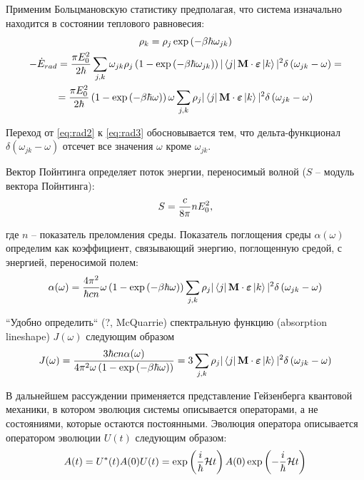 \documentclass[12pt]{article}
\newcommand{\lb}{\left(}
\newcommand{\rb}{\right)}
\newcommand{\mH}{\mathcal{H}}
\newcommand{\mf}{\mathbf}
\newcommand{\vverh}{\vspace*{-0.15cm}}
\begin{document}
Применим Больцмановскую статистику предполагая, что система изначально находится в состоянии теплового равновесия:
\vverh
\begin{gather}
	\rho_k = \rho_j \exp \lb - \beta \hbar \omega_{jk} \rb \notag \\
	- \dot{E}_{rad} = \frac{\pi E_0^2}{2 \hbar} \sum_{j, k} \omega_{jk} \rho_j \lb 1 - \exp \lb - \beta \hbar \omega_{jk} \rb \rb | \bra{j} \mf{M} \cdot \boldsymbol{\varepsilon} \ket{k} |^2 \delta \lb \omega_{jk} - \omega \rb = \label{eq:rad2} \\
	= \frac{\pi E_0^2}{2 \hbar} \lb 1 - \exp \lb - \beta \hbar \omega \rb \rb \omega \sum_{j, k} \rho_j | \bra{j} \mf{M} \cdot \boldsymbol{\varepsilon} \ket{k} |^2 \delta \lb \omega_{jk} - \omega \rb \label{eq:rad3} 
\end{gather}

Переход от \eqref{eq:rad2} к \eqref{eq:rad3} обосновывается тем, что дельта-функционал $\delta \lb \omega_{jk} - \omega \rb$ отсечет все значения $\omega$ кроме $\omega_{jk}$.  

Вектор Пойнтинга определяет поток энергии, переносимый волной ($S$ -- модуль вектора Пойнтинга):
\vverh
\begin{gather}
	S = \frac{c}{8 \pi} n E_0^2, \notag
\end{gather}

где $n$ -- показатель преломления среды. Показатель поглощения среды $\alpha(\omega)$ определим как коэффициент, связывающий энергию, поглощенную средой, с энергией, переносимой полем:
\vverh
\begin{gather}
	\alpha(\omega) = \frac{4 \pi^2}{\hbar c n} \omega \lb 1 - \exp \lb - \beta \hbar \omega \rb \rb \sum_{j, k} \rho_j | \bra{j} \mf{M} \cdot \boldsymbol{\varepsilon} \ket{k} |^2 \delta \lb \omega_{jk} - \omega \rb \notag
\end{gather}

``Удобно определить`` (?, McQuarrie) спектральную функцию (absorption lineshape) $J(\omega)$ следующим образом  
\vverh
\begin{gather}
	J(\omega) = \frac{3 \hbar c n \alpha(\omega)}{4 \pi^2 \omega \lb 1 - \exp \lb - \beta \hbar \omega \rb \rb} = 3 \sum_{j, k} \rho_j | \bra{j} \mf{M} \cdot \boldsymbol{\varepsilon} \ket{k} |^2 \delta \lb \omega_{jk} - \omega \rb \label{eq:specfunc} 
\end{gather}

В дальнейшем рассуждении применяется представление Гейзенберга квантовой механики, в котором эволюция системы описывается операторами, а не состояниями, которые остаются постоянными. Эволюция оператора описывается оператором эволюции $U(t)$ следующим образом:
\vverh
\begin{gather}
	A(t) = U^{*}(t) A(0) U(t) = \exp \lb \frac{i}{\hbar} \mH t \rb A(0) \exp \lb - \frac{i}{\hbar} \mH t \rb \notag
\end{gather}
\end{document}
